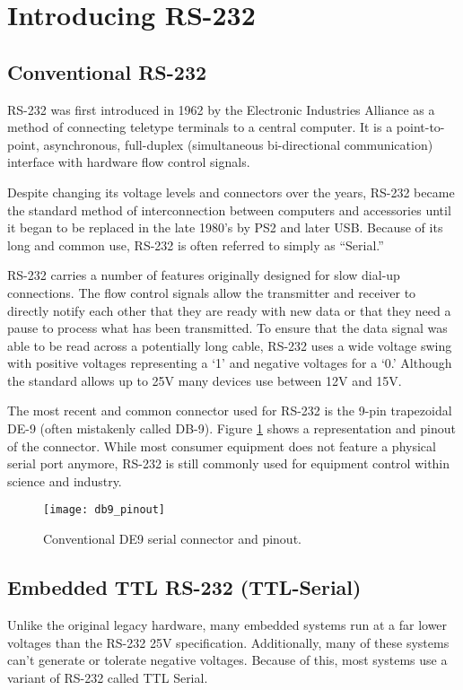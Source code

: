 \documentclass[11pt,fleqn]{book} %
\begin{document}
\section{Introducing RS-232}
\subsection{Conventional RS-232}
RS-232 was first introduced in 1962 by the Electronic Industries Alliance as a method of connecting teletype terminals to a central computer. It is a point-to-point, asynchronous, full-duplex (simultaneous bi-directional communication) interface with hardware flow control signals. 

Despite changing its voltage levels and connectors over the years, RS-232 became the standard method of interconnection between computers and accessories until it began to be replaced in the late 1980's by PS2 and later USB. Because of its long and common use, RS-232 is often referred to simply as ``Serial.'' 

RS-232 carries a number of features originally designed for slow dial-up connections. The flow control signals allow the transmitter and receiver to directly notify each other that they are ready with new data or that they need a pause to process what has been transmitted. To ensure that the data signal was able to be read across a potentially long cable, RS-232 uses a wide voltage swing with positive voltages representing a `1' and negative voltages for a `0.' Although the standard allows up to {\textpm}25V many devices use between {\textpm}12V and {\textpm}15V.

The most recent and common connector used for RS-232 is the 9-pin trapezoidal DE-9 (often mistakenly called DB-9). Figure \ref{db9_pinout} shows a representation and pinout of the connector. While most consumer equipment does not feature a physical serial port anymore, RS-232 is still commonly used for equipment control within science and industry. 


\begin{figure}[]
    \centering\texttt{[image: db9\_pinout]}
    \caption{Conventional DE9 serial connector and pinout.}
    \label{db9_pinout}
\end{figure} 

\subsection{Embedded TTL RS-232 (TTL-Serial)}
Unlike the original legacy hardware, many embedded systems run at a far lower voltages than the  RS-232 {\textpm}25V specification. Additionally, many of these systems can't generate or tolerate negative voltages. Because of this, most systems use a variant of RS-232 called TTL Serial.
\end{document}

